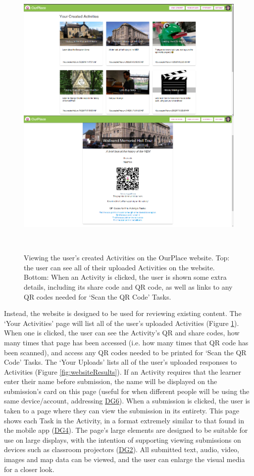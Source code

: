 \begin{figure}
  \centering
  \includegraphics[width=0.85\columnwidth]{images/chapter05/webActivities.png}
  \caption[The OurPlace website: the user's Activities]{Viewing the user's created Activities on the OurPlace website. Top: the user can see all of their uploaded Activities on the website. Bottom: When an Activity is clicked, the user is shown some extra details, including its share code and QR code, as well as links to any QR codes needed for `Scan the QR Code' Tasks.}~\label{fig:websiteActivities}
\end{figure}

Instead, the website is designed to be used for reviewing existing content. The `Your Activities' page will list all of the user's uploaded Activities (Figure \ref{fig:websiteActivities}). When one is clicked, the user can see the Activity's QR and share codes, how many times that page has been accessed (i.e. how many times that QR code has been scanned), and access any QR codes needed to be printed for `Scan the QR Code' Tasks. The `Your Uploads' lists all of the user's uploaded responses to Activities (Figure \ref{fig:websiteResults}). If an Activity requires that the learner enter their name before submission, the name will be displayed on the submission's card on this page (useful for when different people will be using the same device/account, addressing \hyperref[DG6]{DG6}). When a submission is clicked, the user is taken to a page where they can view the submission in its entirety. This page shows each Task in the Activity, in a format extremely similar to that found in the mobile app (\hyperref[DG4]{DG4}). The page's large elements are designed to be suitable for use on large displays, with the intention of supporting viewing submissions on devices such as classroom projectors (\hyperref[DG2]{DG2}). All submitted text, audio, video, images and map data can be viewed, and the user can enlarge the visual media for a closer look.

